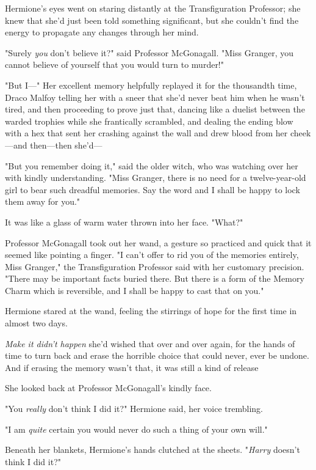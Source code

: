Hermione's eyes went on staring distantly at the Transfiguration Professor; she
knew that she'd just been told something significant, but she couldn't find the
energy to propagate any changes through her mind.

"Surely \emph{you} don't believe it?" said Professor McGonagall. "Miss Granger,
you cannot believe of yourself that you would turn to murder!"

"But I\mbox{---}" Her excellent memory helpfully replayed it for the thousandth time,
Draco Malfoy telling her with a sneer that she'd never beat him when he wasn't
tired, and then proceeding to prove just that, dancing like a duelist between
the warded trophies while she frantically scrambled, and dealing the ending
blow with a hex that sent her crashing against the wall and drew blood from her
cheek---and then---then she'd---

"But you remember doing it," said the older witch, who was watching over her
with kindly understanding. "Miss Granger, there is no need for a
twelve-year-old girl to bear such dreadful memories. Say the word and I shall
be happy to lock them away for you."

It was like a glass of warm water thrown into her face. "What?"

Professor McGonagall took out her wand, a gesture so practiced and quick that
it seemed like pointing a finger. "I can't offer to rid you of the memories
entirely, Miss Granger," the Transfiguration Professor said with her customary
precision. "There may be important facts buried there. But there is a form of
the Memory Charm which is reversible, and I shall be happy to cast that on you."

Hermione stared at the wand, feeling the stirrings of hope for the first time
in almost two days.

\emph{Make it didn't happen{\el}} she'd wished that over and over again, for
the hands of time to turn back and erase the horrible choice that could never,
ever be undone. And if erasing the memory wasn't that, it was still a kind of
release{\el}

She looked back at Professor McGonagall's kindly face.

"You \emph{really} don't think I did it?" Hermione said, her voice trembling.

"I am \emph{quite} certain you would never do such a thing of your own will."

Beneath her blankets, Hermione's hands clutched at the sheets. "\emph{Harry}
doesn't think I did it?"

